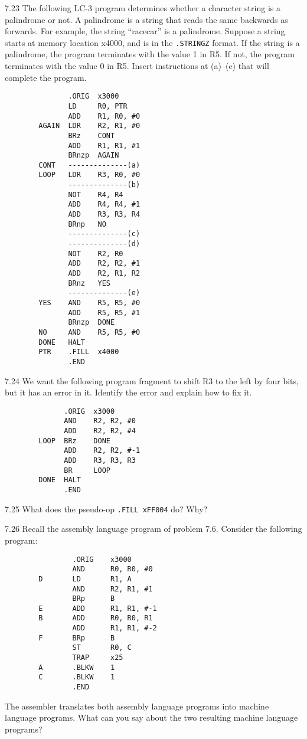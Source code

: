 \documentclass{patt}
\begin{document}
\begin{exercises}
\item[7.23] The following LC-3 program determines whether a character
  string is a palindrome or not. A palindrome is a string that reads
  the same backwards as forwards. For example, the string ``racecar''
  is a palindrome. Suppose a string starts at memory location x4000,
  and is in the \verb+.STRINGZ+ format. If the string is a palindrome,
  the program terminates with the value 1 in R5. If not, the program
  terminates with the value 0 in R5. Insert instructions at (a)--(e)
  that will complete the program.
\begin{lstlisting}
               .ORIG  x3000
               LD     R0, PTR
               ADD    R1, R0, #0
        AGAIN  LDR    R2, R1, #0
               BRz    CONT
               ADD    R1, R1, #1
               BRnzp  AGAIN
        CONT   --------------(a)
        LOOP   LDR    R3, R0, #0
               --------------(b)
               NOT    R4, R4
               ADD    R4, R4, #1
               ADD    R3, R3, R4
               BRnp   NO
               --------------(c)
               --------------(d)
               NOT    R2, R0
               ADD    R2, R2, #1
               ADD    R2, R1, R2
               BRnz   YES
               --------------(e)
        YES    AND    R5, R5, #0
               ADD    R5, R5, #1
               BRnzp  DONE
        NO     AND    R5, R5, #0
        DONE   HALT
        PTR    .FILL  x4000
               .END
\end{lstlisting}

\item[7.24] We want the following program fragment to shift R3 to the
  left by four bits, but it has an error in it. Identify the error and
  explain how to fix it.
\begin{lstlisting}
              .ORIG  x3000
              AND    R2, R2, #0
              ADD    R2, R2, #4
        LOOP  BRz    DONE
              ADD    R2, R2, #-1
              ADD    R3, R3, R3
              BR     LOOP
        DONE  HALT
              .END
\end{lstlisting}

\item[7.25] What does the pseudo-op \verb+.FILL xFF004+ do?
  Why?

\item[7.26] Recall the assembly language program of problem 7.6.
Consider the following program:
\begin{lstlisting}
                .ORIG    x3000
                AND      R0, R0, #0
        D       LD       R1, A
                AND      R2, R1, #1
                BRp      B
        E       ADD      R1, R1, #-1
        B       ADD      R0, R0, R1
                ADD      R1, R1, #-2
        F       BRp      B
                ST       R0, C
                TRAP     x25
        A       .BLKW    1
        C       .BLKW    1
                .END
\end{lstlisting}
The assembler translates both assembly language programs into machine
language programs. What can you say about the two resulting machine
language programs?


\end{exercises}
\end{document}
